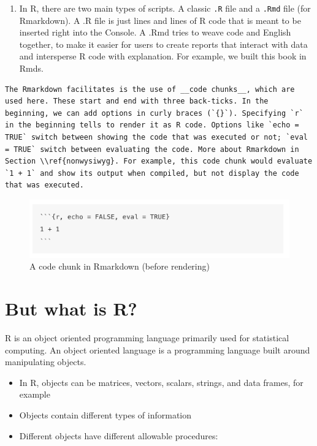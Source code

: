 \documentclass[
]{book}
\providecommand{\tightlist}{%
  \setlength{\itemsep}{0pt}\setlength{\parskip}{0pt}}
\theoremstyle{definition}
\theoremstyle{definition}
\theoremstyle{definition}
\theoremstyle{remark}
\begin{document}
\begin{enumerate}
\def\labelenumi{\arabic{enumi}.}
\setcounter{enumi}{4}
\tightlist
\item
  In R, there are two main types of scripts. A classic \texttt{.R} file and a \texttt{.Rmd} file (for Rmarkdown). A .R file is just lines and lines of R code that is meant to be inserted right into the Console. A .Rmd tries to weave code and English together, to make it easier for users to create reports that interact with data and intersperse R code with explanation. For example, we built this book in Rmds.
\end{enumerate}

\begin{verbatim}
The Rmarkdown facilitates is the use of __code chunks__, which are used here. These start and end with three back-ticks. In the beginning, we can add options in curly braces (`{}`). Specifying `r` in the beginning tells to render it as R code. Options like `echo = TRUE` switch between showing the code that was executed or not; `eval = TRUE` switch between evaluating the code. More about Rmarkdown in Section \\ref{nonwysiwyg}. For example, this code chunk would evaluate `1 + 1` and show its output when compiled, but not display the code that was executed.
\end{verbatim}

\begin{figure}
\centering
\includegraphics{images/11_4_codechunk.png}
\caption{A code chunk in Rmarkdown (before rendering)}
\end{figure}

\newpage

\hypertarget{but-what-is-r}{%
\section{But what is R?}\label{but-what-is-r}}

R is an object oriented programming language primarily used for statistical computing. An object oriented language is a programming language built around manipulating objects.

\begin{itemize}
\tightlist
\item
  In R, objects can be matrices, vectors, scalars, strings, and data frames, for example
\item
  Objects contain different types of information
\item
  Different objects have different allowable procedures:
\end{itemize}
\end{document}

